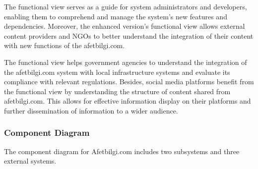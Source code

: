 \documentclass[12pt, letterpaper]{article}
\begin{document}
The functional view serves as a guide for system administrators and developers, enabling them to comprehend and manage the system's new features and dependencies. Moreover, the enhanced version's functional view allows external content providers and NGOs to better understand the integration of their content with new functions of the afetbilgi.com.

The functional view helps government agencies to understand the integration of the afetbilgi.com system with local infrastructure systems and evaluate its compliance with relevant regulations. Besides, social media platforms benefit from the functional view by understanding the structure of content shared from afetbilgi.com. This allows for effective information display on their platforms and further dissemination of information to a wider audience.

\subsubsection{Component Diagram}

The component diagram for Afetbilgi.com includes two subsystems and three external systems. 
\end{document}
